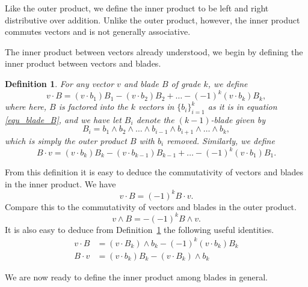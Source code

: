 \documentclass[12pt]{article}
\numberwithin{equation}{section}
\newtheorem{definition}{Definition}[section]
\begin{document}
Like the outer product, we define the inner product to be left and
right distributive over addition.  Unlike the outer product, however,
the inner product commutes vectors and is not generally associative.

The inner product between vectors already understood, we begin
by defining the inner product between vectors and blades.

\begin{definition}\label{def_vec_blade_inner_prod}
For any vector $v$ and blade $B$ of grade $k$, we define
\begin{equation}\label{equ_v_dot_B_expanded}
v\cdot B = (v\cdot b_1)B_1 - (v\cdot b_2)B_2 + \dots - (-1)^k(v\cdot b_k)B_k,
\end{equation}
where here, $B$ is factored into the $k$ vectors in $\{b_i\}_{i=1}^k$ as it
is in equation \eqref{equ_blade_B}, and we have let $B_i$ denote the $(k-1)$-blade
given by
\begin{equation}
B_i = b_1\wedge b_2\wedge\dots\wedge b_{i-1}\wedge b_{i+1}\wedge\dots\wedge b_k,
\end{equation}
which is simply the outer product $B$ with $b_i$ removed.  Similarly, we define
\begin{equation}
B\cdot v = (v\cdot b_k)B_k - (v\cdot b_{k-1})B_{k-1} +\dots - (-1)^k(v\cdot b_1)B_1.
\end{equation}
\end{definition}
From this definition it is easy to deduce the commutativity of vectors and
blades in the inner product.  We have
\begin{equation}
v\cdot B = (-1)^k B\cdot v.
\end{equation}
Compare this to the commutativity of vectors and blades in the outer product.
\begin{equation}
v\wedge B = -(-1)^k B\wedge v.
\end{equation}
It is also easy to deduce from Definition~\ref{def_vec_blade_inner_prod} the
following useful identities.
\begin{align}
v\cdot B &= (v\cdot B_k)\wedge b_k-(-1)^k(v\cdot b_k)B_k\label{equ_v_dot_B_recursive_ident} \\
B\cdot v &= (v\cdot b_k)B_k - (v\cdot B_k)\wedge b_k
\end{align}

We are now ready to define the inner product among blades
in general.
\end{document}
